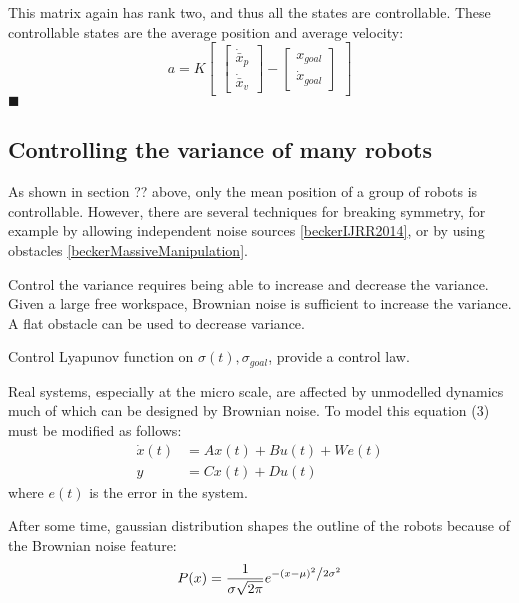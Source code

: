 This matrix again  has rank two, and thus all the states are controllable. These controllable states are the average position and average velocity:
\begin{equation}
a = K\begin{bmatrix}
\begin{bmatrix}
\dot{\bar{x}}_p \\
\dot{\bar{x}}_v
\end{bmatrix}
-
\begin{bmatrix}
x_{goal} \\
\dot{x}_{goal}
\end{bmatrix}
\end{bmatrix}
\end{equation}
$\blacksquare$ \\

\subsection{Controlling the variance of many robots}

As shown in section ?? above, only the mean position of a group of robots is controllable. However, there are several techniques for breaking symmetry, for example  by allowing independent noise sources \ref{beckerIJRR2014}, or by using obstacles \ref{beckerMassiveManipulation}.

Control the variance requires being able to increase and decrease the variance.  Given a large free workspace, Brownian noise is sufficient to increase the variance.  A flat obstacle can be used to decrease variance.  

Control Lyapunov function on $\sigma(t), \sigma_{goal}$, provide a control law.


Real systems, especially at the micro scale, are affected by unmodelled dynamics much of which can be designed by Brownian noise. To model this equation (3) must be modified as follows:
\begin{align}
\dot{x}(t)  &=  A x(t) + B u(t) + We(t)\\
y &= C x(t) + D u(t)\nonumber
\end{align}
where $e(t)$ is the error in the system.

After some time, gaussian distribution shapes the outline of the robots because of the Brownian noise feature:\\
\begin{equation}
P(x) = \frac{1}{{\sigma \sqrt {2\pi } }}e^{{{ - \left( {x - \mu } \right)^2 } \mathord{\left/ {\vphantom {{ - \left( {x - \mu } \right)^2 } {2\sigma ^2 }}} \right. \kern-\nulldelimiterspace} {2\sigma ^2 }}}
\end{equation}

